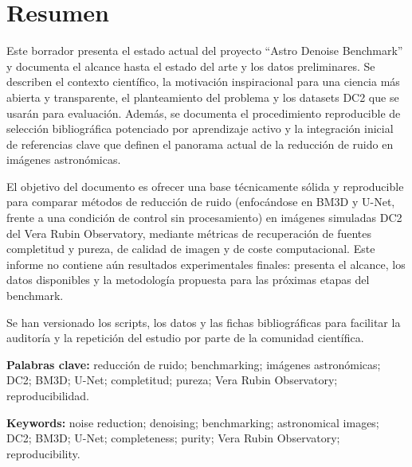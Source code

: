 \chapter*{Resumen}

Este borrador presenta el estado actual del proyecto ``Astro Denoise Benchmark'' y documenta el alcance hasta el estado del arte y los datos preliminares. Se describen el contexto cient\'ifico, la motivaci\'on inspiracional para una ciencia m\'as abierta y transparente, el planteamiento del problema y los datasets DC2 que se usar\'an para evaluaci\'on. Adem\'as, se documenta el procedimiento reproducible de selecci\'on bibliogr\'afica potenciado por aprendizaje activo y la integraci\'on inicial de referencias clave que definen el panorama actual de la reducci\'on de ruido en im\'agenes astron\'omicas.

El objetivo del documento es ofrecer una base t\'ecnicamente s\'olida y reproducible para comparar m\'etodos de reducci\'on de ruido (enfoc\'andose en BM3D y U-Net, frente a una condici\'on de control sin procesamiento) en im\'agenes simuladas DC2 del Vera Rubin Observatory, mediante m\'etricas de recuperaci\'on de fuentes \textemdash completitud y pureza\textemdash, de calidad de imagen y de coste computacional. Este informe no contiene a\'un resultados experimentales finales: presenta el alcance, los datos disponibles y la metodolog\'ia propuesta para las pr\'oximas etapas del benchmark.

Se han versionado los scripts, los datos y las fichas bibliogr\'aficas para facilitar la auditor\'ia y la repetici\'on del estudio por parte de la comunidad cient\'ifica.

\bigskip

\textbf{Palabras clave:} reducci\'on de ruido; benchmarking; im\'agenes astron\'omicas; DC2; BM3D; U-Net; completitud; pureza; Vera Rubin Observatory; reproducibilidad.

\bigskip

\textbf{Keywords:} noise reduction; denoising; benchmarking; astronomical images; DC2; BM3D; U-Net; completeness; purity; Vera Rubin Observatory; reproducibility.
